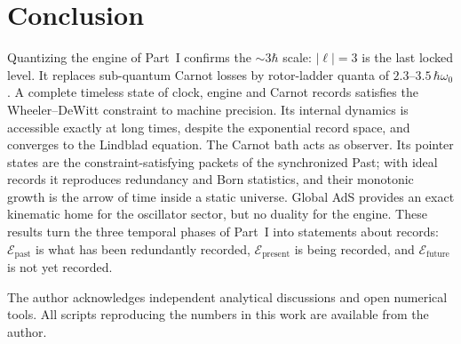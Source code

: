 \documentclass[aps,prc,twocolumn,superscriptaddress,amsmath,amssymb,nofootinbib]{revtex4-2}
\newcommand{\Epast}{\mathcal{E}_{\text{past}}}
\newcommand{\Epres}{\mathcal{E}_{\text{present}}}
\newcommand{\Efut}{\mathcal{E}_{\text{future}}}
\begin{document}
\section{Conclusion}
Quantizing the engine of Part~I confirms the $\sim3\hbar$ scale: $|\ell|=3$ is the last locked level. It replaces sub-quantum Carnot losses by rotor-ladder quanta of $2.3$--$3.5\,\hbar\omega_0$. A complete timeless state of clock, engine and Carnot records satisfies the Wheeler--DeWitt constraint to machine precision. Its internal dynamics is accessible exactly at long times, despite the exponential record space, and converges to the Lindblad equation. The Carnot bath acts as observer. Its pointer states are the constraint-satisfying packets of the synchronized Past; with ideal records it reproduces redundancy and Born statistics, and their monotonic growth is the arrow of time inside a static universe. Global AdS provides an exact kinematic home for the oscillator sector, but no duality for the engine. These results turn the three temporal phases of Part~I into statements about records: $\Epast$ is what has been redundantly recorded, $\Epres$ is being recorded, and $\Efut$ is not yet recorded.

\begin{acknowledgments}
The author acknowledges independent analytical discussions and open numerical tools. All scripts reproducing the numbers in this work are available from the author.
\end{acknowledgments}
\end{document}
